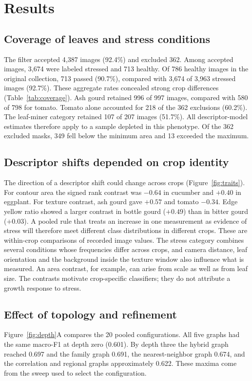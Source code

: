 \section{Results}
\subsection{Coverage of leaves and stress conditions}
The filter accepted 4,387 images (92.4\%) and excluded 362. Among accepted images, 3,674 were labeled stressed and 713 healthy. Of 786 healthy images in the original collection, 713 passed (90.7\%), compared with 3,674 of 3,963 stressed images (92.7\%). These aggregate rates concealed strong crop differences (Table~\ref{tab:coverage}). Ash gourd retained 996 of 997 images, compared with 580 of 798 for tomato. Tomato alone accounted for 218 of the 362 exclusions (60.2\%). The leaf-miner category retained 107 of 207 images (51.7\%). All descriptor-model estimates therefore apply to a sample depleted in this phenotype. Of the 362 excluded masks, 349 fell below the minimum area and 13 exceeded the maximum.
\showpanel{\cohorttable}

\subsection{Descriptor shifts depended on crop identity}
The direction of a descriptor shift could change across crops (Figure~\ref{fig:traits}). For contour area the signed rank contrast was $-0.64$ in cucumber and $+0.40$ in eggplant. For texture contrast, ash gourd gave $+0.57$ and tomato $-0.34$. Edge yellow ratio showed a larger contrast in bottle gourd ($+0.49$) than in bitter gourd ($+0.03$). A pooled rule that treats an increase in one measurement as evidence of stress will therefore meet different class distributions in different crops. These are within-crop comparisons of recorded image values. The stress category combines several conditions whose frequencies differ across crops, and camera distance, leaf orientation and the background inside the texture window also influence what is measured. An area contrast, for example, can arise from scale as well as from leaf size. The contrasts motivate crop-specific classifiers; they do not attribute a growth response to stress.
\showpanel{\traitpanel}

\subsection{Effect of topology and refinement}
Figure~\ref{fig:depth}A compares the 20 pooled configurations. All five graphs had the same macro-F1 at depth zero (0.601). By depth three the hybrid graph reached 0.697 and the family graph 0.691, the nearest-neighbor graph 0.674, and the correlation and regional graphs approximately 0.622. These maxima come from the sweep used to select the configuration.
\showpanel{\depthpanel}

